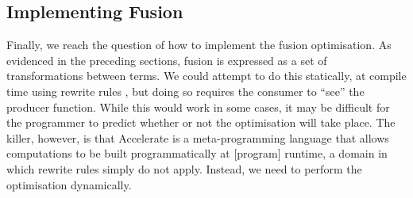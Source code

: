 \subsection{Implementing Fusion}

% 
% 
% 


Finally, we reach the question of how to implement the fusion optimisation. As
evidenced in the preceding sections, 
fusion is expressed as a set of transformations between terms. We could attempt
to do this statically, at compile time using rewrite rules \cite{Jones:2001wm},
but doing so requires the consumer to ``see'' the producer function. While this
would work in some cases, it may be difficult for the programmer to predict
whether or not the optimisation will take place. The killer, however, is that
Accelerate is a meta-programming language that allows computations to be built
programmatically at [program] runtime, a domain in which rewrite rules simply do
not apply. Instead, we need to perform the optimisation dynamically.


